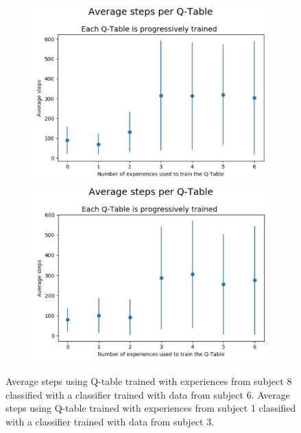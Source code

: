 \documentclass[journal]{IEEEtran}
\begin{document}
{{%


\begin{figure}[h!]
\begin{subfigure}{0.5\textwidth}
\includegraphics[scale=0.2]{Images/Average_steps/marta_santiago.png}
\includegraphics[scale=0.2]{Images/Average_steps/alex_jose.png}
\end{subfigure}
\caption{Average steps using Q-table trained with experiences from subject 8 classified with a classifier trained with data from subject 6. Average steps using Q-table trained with experiences from subject 1 classified with a classifier trained with data from subject 3.}
\label{fig:transferlearning}
\end{figure}


}}
\end{document}
